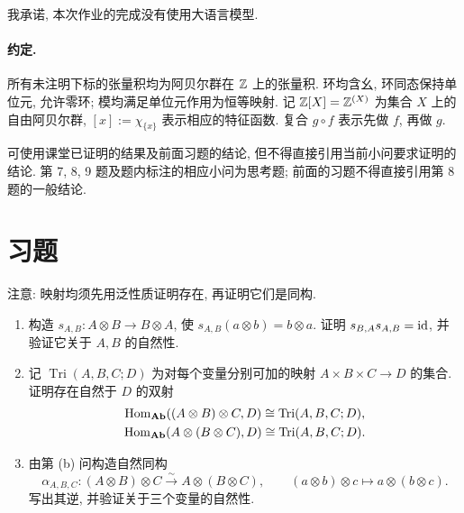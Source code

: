 \documentclass{article}
\begin{document}
{\heiti 我承诺, 本次作业的完成没有使用大语言模型.}

\paragraph{约定.} 所有未注明下标的张量积均为阿贝尔群在 $\mathbb{Z}$ 上的张量积. 环均含幺, 环同态保持单位元, 允许零环; 模均满足单位元作用为恒等映射. 记 $\mathbb{Z}[X]=\mathbb{Z}^{(X)}$ 为集合 $X$ 上的自由阿贝尔群, $[x]:=\chi_{\{x\}}$ 表示相应的特征函数. 复合 $g\circ f$ 表示先做 $f$, 再做 $g$.

可使用课堂已证明的结果及前面习题的结论, 但不得直接引用当前小问要求证明的结论. 第 7, 8, 9 题及题内标注的相应小问为思考题; 前面的习题不得直接引用第 8 题的一般结论.

\section*{习题}

\begin{problem}
注意: 映射均须先用泛性质证明存在, 再证明它们是同构.
\begin{enumerate}
  \item[(a)] 构造 $s_{A,B}:A\otimes B\to B\otimes A$, 使 $s_{A,B}(a\otimes b)=b\otimes a$. 证明 $s_{B,A}s_{A,B}=\operatorname{id}$, 并验证它关于 $A,B$ 的自然性.
  \item[(b)] 记 $\operatorname{Tri}(A,B,C;D)$ 为对每个变量分别可加的映射 $A\times B\times C\to D$ 的集合. 证明存在自然于 $D$ 的双射
  \begin{gather*}
    \operatorname{Hom}_{\mathbf{Ab}}((A\otimes B)\otimes C,D)\cong\operatorname{Tri}(A,B,C;D),\\
    \operatorname{Hom}_{\mathbf{Ab}}(A\otimes(B\otimes C),D)\cong\operatorname{Tri}(A,B,C;D).
  \end{gather*}
  \item[(c)] 由第 (b) 问构造自然同构
  \[
    \alpha_{A,B,C}:(A\otimes B)\otimes C\xrightarrow{\sim}A\otimes(B\otimes C),\qquad
    (a\otimes b)\otimes c\longmapsto a\otimes(b\otimes c).
  \]
  写出其逆, 并验证关于三个变量的自然性.
\end{enumerate}
\end{problem}
\end{document}
